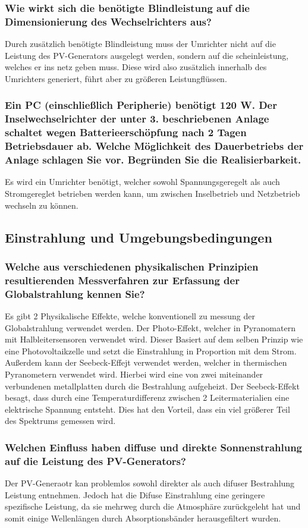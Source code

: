 \subsubsection{Wie wirkt sich die benötigte Blindleistung auf die Dimensionierung des Wechselrichters aus?}
Durch zusätzlich benötigte Blindleistung muss der Umrichter nicht auf die Leistung des PV-Generators ausgelegt werden, sondern auf die scheinleistung, welches er ins netz geben muss.
Diese wird also zusätzlich innerhalb des Umrichters generiert, führt aber zu größeren Leistungflüssen.\cite{SMA_Q-Auslegung}
\subsubsection{Ein PC (einschließlich Peripherie) benötigt 120 W. Der Inselwechselrichter der unter 3. beschriebenen Anlage schaltet wegen Batterieerschöpfung nach 2 Tagen Betriebsdauer ab. Welche Möglichkeit des Dauerbetriebs der Anlage schlagen Sie vor. Begründen Sie die Realisierbarkeit.}
Es wird ein Umrichter benötigt, welcher sowohl Spannungsgeregelt als auch Stromgereglet betrieben werden kann, um zwischen Inselbetrieb und Netzbetrieb wechseln zu können.
\subsection{Einstrahlung und Umgebungsbedingungen}
\subsubsection{Welche aus verschiedenen physikalischen Prinzipien resultierenden Messverfahren zur Erfassung der Globalstrahlung kennen Sie?}
Es gibt 2 Physikalische Effekte, welche konventionell zu messung der Globalstrahlung verwendet werden. 
Der Photo-Effekt, welcher in Pyranomatern mit Halbleitersensoren verwendet wird. 
Dieser Basiert auf dem selben Prinzip wie eine Photovoltaikzelle und setzt die Einstrahlung in Proportion mit dem Strom.
Außerdem kann der Seebeck-Effejt verwendet werden, welcher in thermischen Pyranometern verwendet wird.
Hierbei wird eine von zwei miteinander verbundenen metallplatten durch die Bestrahlung aufgeheizt. 
Der Seebeck-Effekt besagt, dass durch eine Temperaturdifferenz zwischen 2 Leitermaterialien eine elektrische Spannung entsteht.\cite{Wiki-Seebeck}
Dies hat den Vorteil, dass ein viel größerer Teil des Spektrums gemessen wird.

\subsubsection{Welchen Einfluss haben diffuse und direkte Sonnenstrahlung auf die Leistung des PV-Generators?}
Der PV-Generaotr kan problemlos sowohl direkter als auch difuser Bestrahlung Leistung entnehmen. 
Jedoch hat die Difuse Einstrahlung eine geringere spezifische Leistung, da sie mehrweg durch die Atmosphäre zurückgeleht hat und somit einige Wellenlängen durch Absorptionsbänder herausgefiltert wurden.
